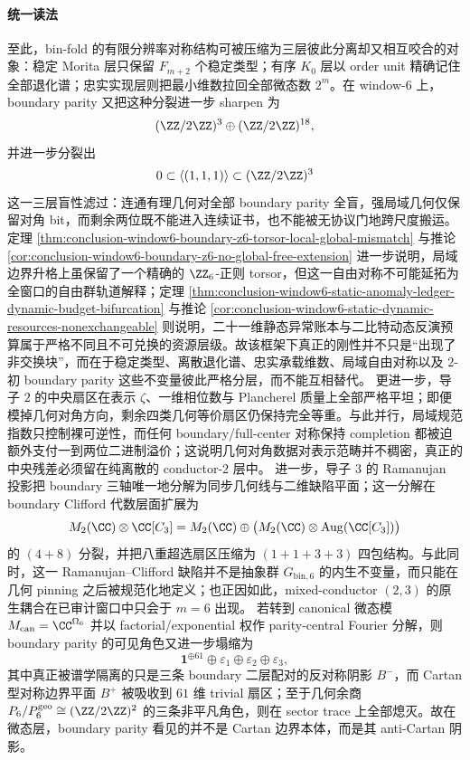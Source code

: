 \paragraph{统一读法}
至此，bin-fold 的有限分辨率对称结构可被压缩为三层彼此分离却又相互咬合的对象：稳定 Morita 层只保留 \(F_{m+2}\) 个稳定类型；有序 \(K_0\) 层以 order unit 精确记住全部退化谱；忠实实现层则把最小维数拉回全部微态数 \(2^m\)。在 window-\(6\) 上，boundary parity 又把这种分裂进一步 sharpen 为
\[
(\ZZ/2\ZZ)^3\oplus (\ZZ/2\ZZ)^{18},
\]
并进一步分裂出
\[
0\subset \langle(1,1,1)\rangle\subset (\ZZ/2\ZZ)^3
\]
这一三层盲性滤过：连通有理几何对全部 boundary parity 全盲，强局域几何仅保留对角 bit，而剩余两位既不能进入连续证书，也不能被无协议门地跨尺度搬运。定理 \ref{thm:conclusion-window6-boundary-z6-torsor-local-global-mismatch} 与推论 \ref{cor:conclusion-window6-boundary-z6-no-global-free-extension} 进一步说明，局域边界升格上虽保留了一个精确的 \(\ZZ_6\)-正则 torsor，但这一自由对称不可能延拓为全窗口的自由群轨道解释；定理 \ref{thm:conclusion-window6-static-anomaly-ledger-dynamic-budget-bifurcation} 与推论 \ref{cor:conclusion-window6-static-dynamic-resources-nonexchangeable} 则说明，二十一维静态异常账本与二比特动态反演预算属于严格不同且不可兑换的资源层级。故该框架下真正的刚性并不只是“出现了非交换块”，而在于稳定类型、离散退化谱、忠实承载维数、局域自由对称以及 \(2\)-初 boundary parity 这些不变量彼此严格分层，而不能互相替代。
更进一步，导子 \(2\) 的中央扇区在表示 \(\zeta\)、一维相位数与 Plancherel 质量上全部严格平坦；即便模掉几何对角方向，剩余四类几何等价扇区仍保持完全等重。与此并行，局域规范指数只控制裸可逆性，而任何 boundary/full-center 对称保持 completion 都被迫额外支付一到两位二进制溢价；这说明几何对角数据对表示范畴并不稠密，真正的中央残差必须留在纯离散的 conductor-\(2\) 层中。
进一步，导子 \(3\) 的 Ramanujan 投影把 boundary 三轴唯一地分解为同步几何线与二维缺陷平面；这一分解在 boundary Clifford 代数层面扩展为
\[
M_2(\CC)\otimes \CC[C_3]
=
M_2(\CC)\oplus \bigl(M_2(\CC)\otimes \mathrm{Aug}(\CC[C_3])\bigr)
\]
的 \((4+8)\) 分裂，并把八重超选扇区压缩为 \((1+1+3+3)\) 四包结构。与此同时，这一 Ramanujan--Clifford 缺陷并不是抽象群 \(G_{\mathrm{bin},6}\) 的内生不变量，而只能在几何 pinning 之后被规范化地定义；也正因如此，mixed-conductor \((2,3)\) 的原生耦合在已审计窗口中只会于 \(m=6\) 出现。
若转到 canonical 微态模 \(M_{\mathrm{can}}=\CC^{\Omega_6}\) 并以 factorial/exponential 权作 parity-central Fourier 分解，则 boundary parity 的可见角色又进一步塌缩为
\[
\mathbf 1^{\oplus 61}\oplus \varepsilon_1\oplus \varepsilon_2\oplus \varepsilon_3,
\]
其中真正被谱学隔离的只是三条 boundary 二层配对的反对称阴影 \(B^-\)，而 Cartan 型对称边界平面 \(B^+\) 被吸收到 \(61\) 维 trivial 扇区；至于几何余商 \(P_6/P_6^{\mathrm{geo}}\cong (\ZZ/2\ZZ)^2\) 的三条非平凡角色，则在 sector trace 上全部熄灭。故在微态层，boundary parity 看见的并不是 Cartan 边界本体，而是其 anti-Cartan 阴影。
